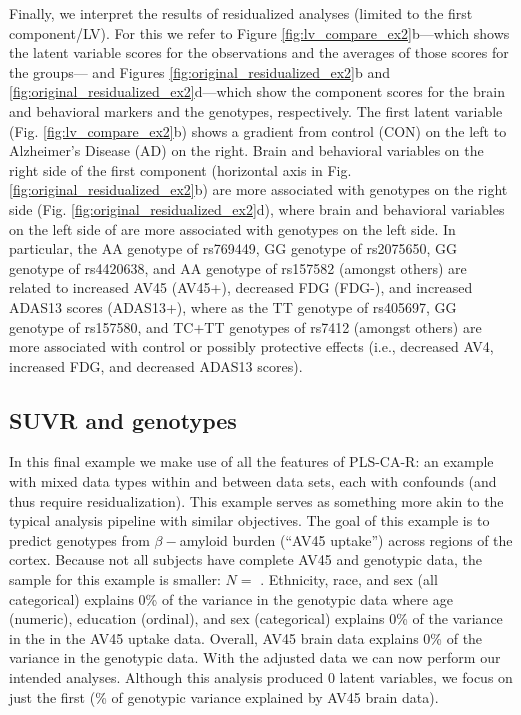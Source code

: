 \documentclass[12pt]{article}
\begin{document}
Finally, we interpret the results of residualized analyses (limited to
the first component/LV). For this we refer to Figure
\ref{fig:lv_compare_ex2}b---which shows the latent variable scores for
the observations and the averages of those scores for the groups--- and
Figures \ref{fig:original_residualized_ex2}b and
\ref{fig:original_residualized_ex2}d---which show the component scores
for the brain and behavioral markers and the genotypes, respectively.
The first latent variable (Fig. \ref{fig:lv_compare_ex2}b) shows a
gradient from control (CON) on the left to Alzheimer's Disease (AD) on
the right. Brain and behavioral variables on the right side of the first
component (horizontal axis in Fig. \ref{fig:original_residualized_ex2}b)
are more associated with genotypes on the right side (Fig.
\ref{fig:original_residualized_ex2}d), where brain and behavioral
variables on the left side of are more associated with genotypes on the
left side. In particular, the AA genotype of rs769449, GG genotype of
rs2075650, GG genotype of rs4420638, and AA genotype of rs157582
(amongst others) are related to increased AV45 (AV45+), decreased FDG
(FDG-), and increased ADAS13 scores (ADAS13+), where as the TT genotype
of rs405697, GG genotype of rs157580, and TC+TT genotypes of rs7412
(amongst others) are more associated with control or possibly protective
effects (i.e., decreased AV4, increased FDG, and decreased ADAS13
scores).

\hypertarget{suvr-and-genotypes}{%
\subsection{SUVR and genotypes}\label{suvr-and-genotypes}}

\label{section:big}

In this final example we make use of all the features of PLS-CA-R: an
example with mixed data types within and between data sets, each with
confounds (and thus require residualization). This example serves as
something more akin to the typical analysis pipeline with similar
objectives. The goal of this example is to predict genotypes from
\(\beta-\)amyloid burden (``AV45 uptake'') across regions of the cortex.
Because not all subjects have complete AV45 and genotypic data, the
sample for this example is smaller: \(N=\) . Ethnicity, race, and sex
(all categorical) explains 0\% of the variance in the genotypic data
where age (numeric), education (ordinal), and sex (categorical) explains
0\% of the variance in the in the AV45 uptake data. Overall, AV45 brain
data explains 0\% of the variance in the genotypic data. With the
adjusted data we can now perform our intended analyses. Although this
analysis produced 0 latent variables, we focus on just the first (\% of
genotypic variance explained by AV45 brain data).
\end{document}
